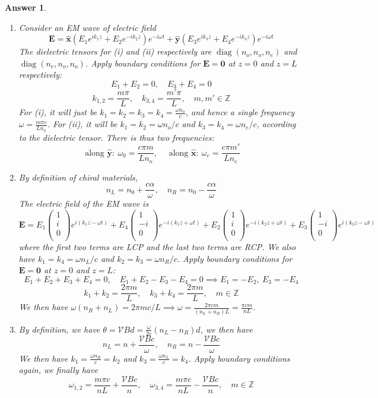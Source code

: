 \documentclass[a4paper]{article}
\DeclareMathOperator{\diag}{diag}
\newtheorem{ans}{Answer}[section]
\theoremstyle{new}
\begin{document}
\begin{ans}\leavevmode
\begin{enumerate}[label=(\alph*)]
\item Consider an EM wave of electric field 
$$\mathbf{E}=\mathbf{\hat{x}}(E_1e^{ik_1z}+E_2e^{-ik_2z})e^{-i\omega t}+\mathbf{\hat{y}}(E_3e^{ik_3z}+E_4e^{-ik_4z})e^{-i\omega t}$$
The dielectric tensors for (i) and (ii) respectively are $\diag(n_o,n_o,n_e)$ and $\diag(n_e,n_o,n_o)$. Apply boundary conditions for $\mathbf{E}=\boldsymbol{0}$ at $z=0$ and $z=L$ respectively: 
$$E_1+E_2=0,\quad E_3+E_4=0$$
$$k_{1,2}=\frac{m\pi}{L},\quad k_{3,4}=\frac{m'\pi}{L},\quad m,m'\in\mathbb{Z}$$
For (i), it will just be $k_1=k_2=k_3=k_4=\frac{\omega n_o}{c}$, and hence a single frequency $\omega=\frac{m\pi c}{Ln_o}$. For (ii), it will be $k_1=k_2=\omega n_o/c$ and $k_3=k_4=\omega n_e/c$, according to the dielectric tensor. There is thus two frequencies:
$$\text{ along }\mathbf{\hat{y}}:~\omega_0=\frac{c\pi m}{Ln_o},\quad\text{ along }\mathbf{\hat{x}}:~\omega_e=\frac{c\pi m'}{L n_e}$$
\item By definition of chiral materials, 
$$n_L=n_0+\frac{c\alpha}{\omega},\quad n_R=n_0-\frac{c\alpha}{\omega}$$
The electric field of the EM wave is
$$\mathbf{E}=E_1\begin{pmatrix}1\\i\\0\\\end{pmatrix}e^{i(k_1z-\omega t)}+E_4\begin{pmatrix}1\\-i\\0\\\end{pmatrix}e^{-i(k_1z+\omega t)}+E_2\begin{pmatrix}1\\i\\0\\\end{pmatrix}e^{-i(k_2z+\omega t)}+E_3\begin{pmatrix}1\\-i\\0\\\end{pmatrix}e^{i(k_3z-\omega t)}$$
where the first two terms are LCP and the last two terms are RCP. We also have $k_1=k_4=\omega n_L/c$ and $k_2=k_3=\omega n_R/c$. Apply boundary conditions for $\mathbf{E}=\boldsymbol{0}$ at $z=0$ and $z=L$:
$$E_1+E_2+E_3+E_4=0,\quad E_1+E_2-E_3-E_4=0\implies E_1=-E_2,~E_3=-E_4$$
$$k_1+k_2=\frac{2\pi m}{L},\quad k_3+k_4=\frac{2\pi m}{L},\quad m\in\mathbb{Z}$$
We then have $\omega(n_R+n_L)=2\pi mc/L\implies\omega=\frac{2\pi cm}{(n_L+n_R)L}=\frac{\pi cm}{nL}$.
\item By definition, we have $\theta=\mathcal{V}Bd=\frac{\omega}{2c}(n_L-n_R)d$, we then have
$$n_L=n+\frac{\mathcal{V}Bc}{\omega},\quad n_R=n-\frac{\mathcal{V}Bc}{\omega}$$
We then have $k_1=\frac{\omega n_R}{c}=k_2$ and $k_3=\frac{\omega n_L}{c}=k_4$. Apply boundary conditions again, we finally have
$$\omega_{1,2}=\frac{m\pi c}{nL}+\frac{\mathcal{V}Bc}{n},\quad\omega_{3,4}=\frac{m\pi c}{nL}-\frac{\mathcal{V}Bc}{n},\quad m\in\mathbb{Z}$$
\end{enumerate}
\end{ans}
\end{document}
